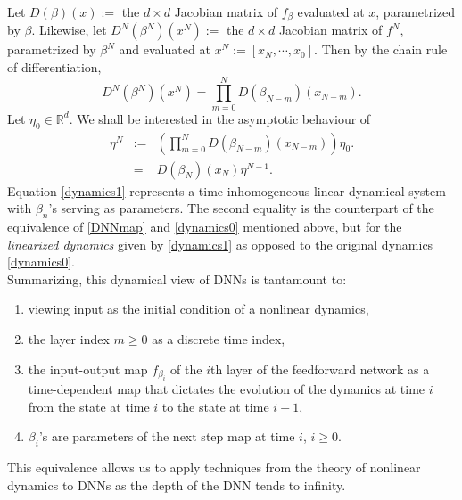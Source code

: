 \documentclass[10pt,a4paper]{amsart}
\newcommand{\R}{\mathbb{R}}
\newcommand{\0}{\textbf{0}}
\begin{document}
Let  $D(\beta)(x) :=$  the $d\times d$ Jacobian matrix of $f_\beta$ evaluated at $x$, parametrized by $\beta$. Likewise, let $D^N(\beta^N)(x^N):=$  the $d\times d$ Jacobian matrix of  $f^N$, parametrized by $\beta^N$ and evaluated at $x^N := [x_N, \cdots , x_0]$. Then by the chain rule of differentiation,
\begin{equation}
D^N(\beta^N)(x^N) = \prod_{m=0}^{N}D(\beta_{N-m})(x_{N-m}). \label{chainrule}
\end{equation}
Let $\eta_0\in \R^d$. We shall be interested in the asymptotic behaviour of 
\begin{eqnarray}
\eta^N &:=& \left(\prod_{m=0}^{N}D(\beta_{N-m})(x_{N-m})\right)\eta_0. \label{mult} \\
&=& D(\beta_N)(x_N)\eta^{N-1}. \label{dynamics1}
\end{eqnarray}
Equation \eqref{dynamics1} represents a time-inhomogeneous linear dynamical system with $\beta_n$'s serving as parameters. The second equality is the counterpart of the equivalence of  \eqref{DNNmap} and \eqref{dynamics0} mentioned above, but for the \textit{linearized dynamics} given by \eqref{dynamics1} as opposed to the original dynamics \eqref{dynamics0}.\\

Summarizing, this dynamical view of DNNs is tantamount to:\\

\begin{enumerate}
\item viewing input as the initial condition of a nonlinear dynamics,\\

\item the layer index $m \geq 0$ as a discrete time index,\\

\item the input-output map $f_{\beta_i}$ of the $i$th layer of the feedforward network as a time-dependent map that dictates the evolution of the dynamics at time $i$ from the state at time $i$ to the state at time $i+1$,\\

\item $\beta_i$'s are parameters of the next step map at time $i$, $i \geq 0$. 
 
 \end{enumerate}
 
 \medskip
 
 This equivalence allows us to apply techniques from the theory of nonlinear dynamics to DNNs as the depth of the DNN tends to infinity.\\
 
\end{document}

